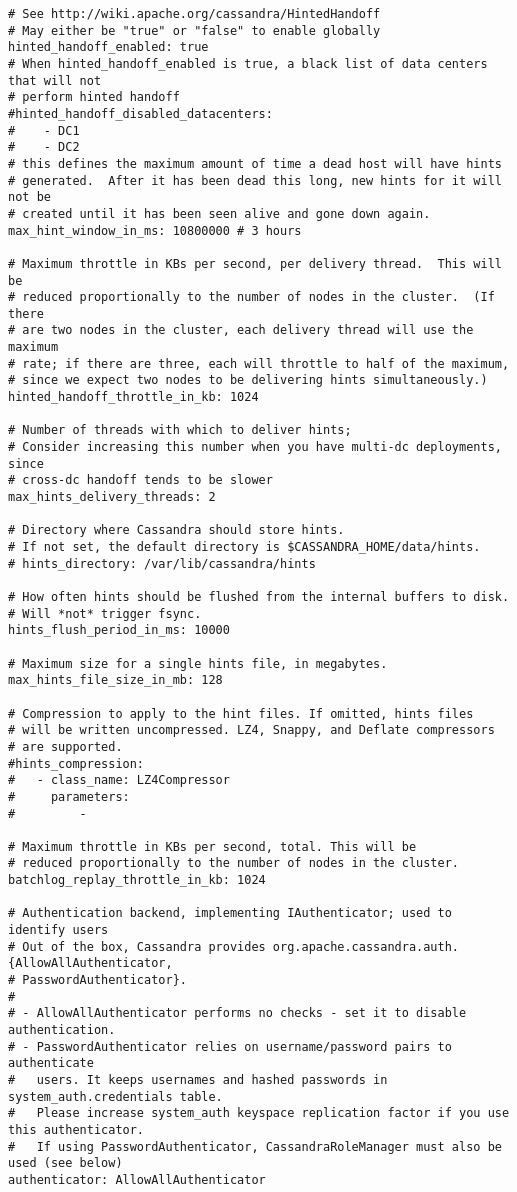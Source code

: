 \begin{verbatim}
# See http://wiki.apache.org/cassandra/HintedHandoff
# May either be "true" or "false" to enable globally
hinted_handoff_enabled: true
# When hinted_handoff_enabled is true, a black list of data centers that will not
# perform hinted handoff
#hinted_handoff_disabled_datacenters:
#    - DC1
#    - DC2
# this defines the maximum amount of time a dead host will have hints
# generated.  After it has been dead this long, new hints for it will not be
# created until it has been seen alive and gone down again.
max_hint_window_in_ms: 10800000 # 3 hours

# Maximum throttle in KBs per second, per delivery thread.  This will be
# reduced proportionally to the number of nodes in the cluster.  (If there
# are two nodes in the cluster, each delivery thread will use the maximum
# rate; if there are three, each will throttle to half of the maximum,
# since we expect two nodes to be delivering hints simultaneously.)
hinted_handoff_throttle_in_kb: 1024

# Number of threads with which to deliver hints;
# Consider increasing this number when you have multi-dc deployments, since
# cross-dc handoff tends to be slower
max_hints_delivery_threads: 2

# Directory where Cassandra should store hints.
# If not set, the default directory is $CASSANDRA_HOME/data/hints.
# hints_directory: /var/lib/cassandra/hints

# How often hints should be flushed from the internal buffers to disk.
# Will *not* trigger fsync.
hints_flush_period_in_ms: 10000

# Maximum size for a single hints file, in megabytes.
max_hints_file_size_in_mb: 128

# Compression to apply to the hint files. If omitted, hints files
# will be written uncompressed. LZ4, Snappy, and Deflate compressors
# are supported.
#hints_compression:
#   - class_name: LZ4Compressor
#     parameters:
#         -

# Maximum throttle in KBs per second, total. This will be
# reduced proportionally to the number of nodes in the cluster.
batchlog_replay_throttle_in_kb: 1024

# Authentication backend, implementing IAuthenticator; used to identify users
# Out of the box, Cassandra provides org.apache.cassandra.auth.{AllowAllAuthenticator,
# PasswordAuthenticator}.
#
# - AllowAllAuthenticator performs no checks - set it to disable authentication.
# - PasswordAuthenticator relies on username/password pairs to authenticate
#   users. It keeps usernames and hashed passwords in system_auth.credentials table.
#   Please increase system_auth keyspace replication factor if you use this authenticator.
#   If using PasswordAuthenticator, CassandraRoleManager must also be used (see below)
authenticator: AllowAllAuthenticator


\end{verbatim}
